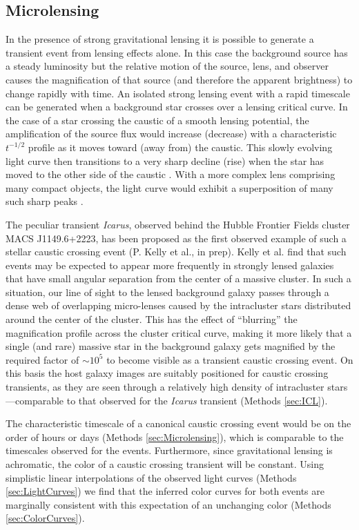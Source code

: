 \subsection{Microlensing}\label{sec:MicroLensing}

In the presence of strong gravitational lensing it is possible to
generate a transient event from lensing effects alone.  In this case
the background source has a steady luminosity but the relative motion
of the source, lens, and observer causes the magnification of that
source (and therefore the apparent brightness) to change rapidly with
time.  An isolated strong lensing event with a rapid timescale can be
generated when a background star crosses over a lensing critical
curve.  In the case of a star crossing the caustic of a smooth lensing
potential, the amplification of the source flux would increase
(decrease) with a characteristic $t^{-1/2}$ profile as it moves toward
(away from) the caustic. This slowly evolving light curve then
transitions to a very sharp decline (rise) when the star has moved to
the other side of the caustic \citep{Schneider:1986,
  MiraldaEscude:1991}.  With a more complex lens comprising many
compact objects, the light curve would exhibit a superposition of many
such sharp peaks \citep{Lewis:1993}.

The peculiar transient {\it Icarus}, observed behind the Hubble
Frontier Fields cluster MACS J1149.6+2223, has been proposed as the
first observed example of such a stellar caustic crossing event
(P. Kelly et al., in prep). Kelly et al. find that such events may be
expected to appear more frequently in strongly lensed galaxies that
have small angular separation from the center of a massive cluster. In
such a situation, our line of sight to the lensed background galaxy
passes through a dense web of overlapping micro-lenses caused by the
intracluster stars distributed around the center of the cluster. This
has the effect of ``blurring'' the magnification profile across the
cluster critical curve, making it more likely that a single (and rare)
massive star in the background galaxy gets magnified by the required
factor of $\sim10^5$ to become visible as a transient caustic crossing
event.  On this basis the \spock host galaxy images are suitably
positioned for caustic crossing transients, as they are seen through a
relatively high density of intracluster stars---comparable to that
observed for the {\it Icarus} transient (Methods \ref{sec:ICL}).

The characteristic timescale of a canonical caustic crossing event
would be on the order of hours or days (Methods
\ref{sec:Microlensing}), which is comparable to the timescales
observed for the \spock events. Furthermore, since gravitational
lensing is achromatic, the color of a caustic crossing transient will
be constant.  Using simplistic linear interpolations of the observed
light curves (Methods \ref{sec:LightCurves}) we find that the inferred
color curves for both \spock events are marginally consistent with
this expectation of an unchanging color (Methods
\ref{sec:ColorCurves}).

